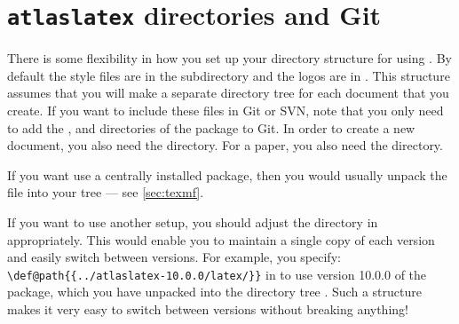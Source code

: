 

\section{\texttt{atlaslatex} directories and Git}
\label{sec:gitsvn}

There is some flexibility in how you set up your directory structure for using .
By default the  style files are in the  subdirectory and the
logos are in . This structure assumes that you will make a separate directory tree
for each document that you create.
If you want to include these files in Git or SVN, note that you only need to add the
,  and  directories of the  package to Git.
In order to create a new document, you also need the  directory.
For a paper, you also need the  directory.

If you want use a centrally installed  package, then you would usually unpack the\\
 file into your  tree --- see \cref{sec:texmf}.

If you want to use another setup, you should adjust the directory in  appropriately.
This would enable you to maintain a single copy of each  version and easily switch between versions.
For example, you specify:
\verb|\def@path{{../atlaslatex-10.0.0/latex/}}|
in 
to use version 10.0.0 of the  package, which you have unpacked into the directory tree
.
Such a structure makes it very easy to switch between  versions without breaking anything!



